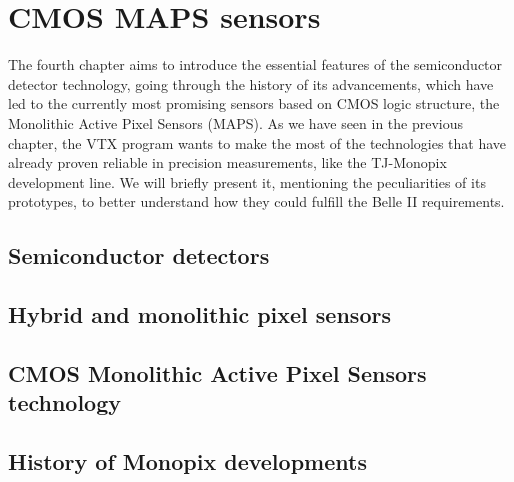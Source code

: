 \chapter{CMOS MAPS sensors}

The fourth chapter aims to introduce the essential features of the semiconductor detector technology, going through the history of its advancements, which have led to the currently most promising sensors based on CMOS logic structure, the Monolithic Active Pixel Sensors (MAPS). As we have seen in the previous chapter, the VTX program wants to make the most of the technologies that have already proven reliable in precision measurements, like the TJ-Monopix development line. We will briefly present it, mentioning the peculiarities of its prototypes, to better understand how they could fulfill the Belle II requirements.


\section{Semiconductor detectors} 


\section{Hybrid and monolithic pixel sensors}


\section{CMOS Monolithic Active Pixel Sensors technology}


\begin{comment}
small fill factor /large fill factor
\end{comment}

\section{History of Monopix developments}




